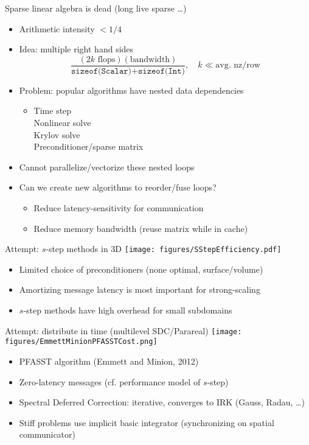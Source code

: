 \documentclass{beamer}
\begin{document}
\begin{frame}{Sparse linear algebra is dead (long live sparse \ldots)}
  \begin{itemize}
  \item Arithmetic intensity $< 1/4$
  \item Idea: multiple right hand sides
    \begin{equation*}
      \frac{(2 k \text{ flops})(\text{bandwidth})}{\texttt{sizeof(Scalar)} + \texttt{sizeof(Int)}}, \quad k \ll \text{avg. nz/row}
    \end{equation*}
  \item Problem: popular algorithms have nested data dependencies
    \begin{itemize}
    \item Time step \\
      \qquad Nonlinear solve \\
      \qquad \qquad Krylov solve \\
      \qquad \qquad \qquad Preconditioner/sparse matrix
    \end{itemize}
  \item Cannot parallelize/vectorize these nested loops
  \item<2> \alert{Can we create new algorithms to reorder/fuse loops?}
    \begin{itemize}
    \item Reduce latency-sensitivity for communication
    \item Reduce memory bandwidth (reuse matrix while in cache)
    \end{itemize}
  \end{itemize}
\end{frame}

\begin{frame}{Attempt: $s$-step methods in 3D}
  \texttt{[image: figures/SStepEfficiency.pdf]}
  \begin{itemize}
  \item Limited choice of preconditioners (none optimal, surface/volume)
  \item Amortizing message latency is most important for strong-scaling
  \item $s$-step methods have high overhead for small subdomains
  \end{itemize}
\end{frame}

\begin{frame}{Attempt: distribute in time (multilevel SDC/Parareal)}
  \texttt{[image: figures/EmmettMinionPFASSTCost.png]}
  \begin{itemize}
  \item PFASST algorithm (Emmett and Minion, 2012)
  \item Zero-latency messages (cf. performance model of $s$-step)
  \item Spectral Deferred Correction: iterative, converges to IRK (Gauss, Radau, \ldots)
  \item Stiff problems use implicit basic integrator (synchronizing on spatial communicator)
  \end{itemize}
\end{frame}
\end{document}
